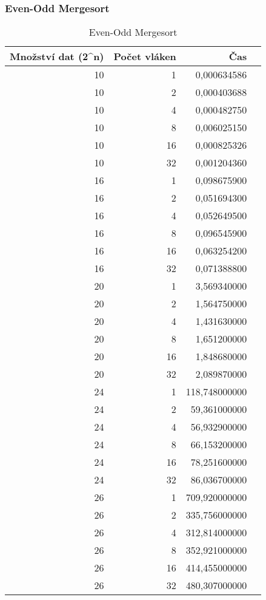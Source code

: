 \documentclass[12pt]{article}
\begin{document}
\subsubsection{Even-Odd Mergesort}
\begin{table}[H]
\begin{center}
\begin{tabular}{|r|r|r|r|}
\hline Množství dat (2^n) & Počet vláken & Čas \\ \hline
10 & 1  & 0,000634586 \\ \hline
10 & 2  & 0,000403688 \\ \hline
10 & 4  & 0,000482750 \\ \hline
10 & 8  & 0,006025150 \\ \hline
10 & 16 & 0,000825326 \\ \hline
10 & 32 & 0,001204360 \\ \hline
16 & 1  & 0,098675900 \\ \hline
16 & 2  & 0,051694300 \\ \hline
16 & 4  & 0,052649500 \\ \hline
16 & 8  & 0,096545900 \\ \hline
16 & 16 & 0,063254200 \\ \hline
16 & 32 & 0,071388800 \\ \hline
20 & 1  & 3,569340000 \\ \hline
20 & 2  & 1,564750000 \\ \hline
20 & 4  & 1,431630000 \\ \hline
20 & 8  & 1,651200000 \\ \hline
20 & 16 & 1,848680000 \\ \hline
20 & 32 & 2,089870000 \\ \hline
24 & 1  & 118,748000000 \\ \hline
24 & 2  & 59,361000000 \\ \hline
24 & 4  & 56,932900000 \\ \hline
24 & 8  & 66,153200000 \\ \hline
24 & 16 & 78,251600000 \\ \hline
24 & 32 & 86,036700000 \\ \hline
26 & 1  & 709,920000000 \\ \hline
26 & 2  & 335,756000000 \\ \hline
26 & 4  & 312,814000000 \\ \hline
26 & 8  & 352,921000000 \\ \hline
26 & 16 & 414,455000000 \\ \hline
26 & 32 & 480,307000000 \\ \hline
\end{tabular} 
\end{center}
\caption{Even-Odd Mergesort}
\end{table}
\end{document}
